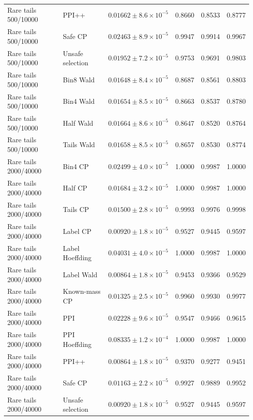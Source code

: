 \begin{longtable}{llrrrr}
Rare tails 500/10000 & PPI++ & $0.01662\pm 8.6\times 10^{-5}$ & 0.8660 & 0.8533 & 0.8777 \\
Rare tails 500/10000 & Safe CP & $0.02463\pm 8.9\times 10^{-5}$ & 0.9947 & 0.9914 & 0.9967 \\
Rare tails 500/10000 & Unsafe selection & $0.01952\pm 7.2\times 10^{-5}$ & 0.9753 & 0.9691 & 0.9803 \\
Rare tails 500/10000 & Bin8 Wald & $0.01648\pm 8.4\times 10^{-5}$ & 0.8687 & 0.8561 & 0.8803 \\
Rare tails 500/10000 & Bin4 Wald & $0.01654\pm 8.5\times 10^{-5}$ & 0.8663 & 0.8537 & 0.8780 \\
Rare tails 500/10000 & Half Wald & $0.01664\pm 8.6\times 10^{-5}$ & 0.8647 & 0.8520 & 0.8764 \\
Rare tails 500/10000 & Tails Wald & $0.01658\pm 8.5\times 10^{-5}$ & 0.8657 & 0.8530 & 0.8774 \\
Rare tails 2000/40000 & Bin4 CP & $0.02499\pm 4.0\times 10^{-5}$ & 1.0000 & 0.9987 & 1.0000 \\
Rare tails 2000/40000 & Half CP & $0.01684\pm 3.2\times 10^{-5}$ & 1.0000 & 0.9987 & 1.0000 \\
Rare tails 2000/40000 & Tails CP & $0.01500\pm 2.8\times 10^{-5}$ & 0.9993 & 0.9976 & 0.9998 \\
Rare tails 2000/40000 & Label CP & $0.00920\pm 1.8\times 10^{-5}$ & 0.9527 & 0.9445 & 0.9597 \\
Rare tails 2000/40000 & Label Hoeffding & $0.04031\pm 4.0\times 10^{-5}$ & 1.0000 & 0.9987 & 1.0000 \\
Rare tails 2000/40000 & Label Wald & $0.00864\pm 1.8\times 10^{-5}$ & 0.9453 & 0.9366 & 0.9529 \\
Rare tails 2000/40000 & Known-mass CP & $0.01325\pm 2.5\times 10^{-5}$ & 0.9960 & 0.9930 & 0.9977 \\
Rare tails 2000/40000 & PPI & $0.02228\pm 9.6\times 10^{-5}$ & 0.9547 & 0.9466 & 0.9615 \\
Rare tails 2000/40000 & PPI Hoeffding & $0.08335\pm 1.2\times 10^{-4}$ & 1.0000 & 0.9987 & 1.0000 \\
Rare tails 2000/40000 & PPI++ & $0.00864\pm 1.8\times 10^{-5}$ & 0.9370 & 0.9277 & 0.9451 \\
Rare tails 2000/40000 & Safe CP & $0.01163\pm 2.2\times 10^{-5}$ & 0.9927 & 0.9889 & 0.9952 \\
Rare tails 2000/40000 & Unsafe selection & $0.00920\pm 1.8\times 10^{-5}$ & 0.9527 & 0.9445 & 0.9597 \\

\end{longtable}

